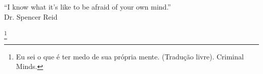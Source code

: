 

\begin{epigrafe}
	\vspace*{17cm}
%						
%								 

\begin{flushright}
	\begin{minipage}[b]{10cm}
		\begin{flushright}
			``I know what it's like to be afraid of your own mind.''\\
			
			Dr. Spencer Reid %
			\\
			
		\end{flushright}
	\end{minipage}
	\footnote{
		Eu sei o que é ter medo de sua própria mente. (Tradução livre). Criminal Minds.} %
\end{flushright}
			
		
			

\end{epigrafe}
